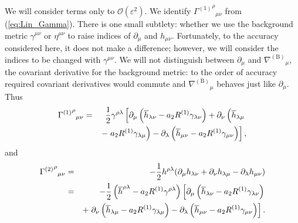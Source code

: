 \documentclass[aps,prd,amsfonts,amssymb,amsmath,nofootinbib,reprint,showpacs]{revtex4-1}
\newcommand{\eqnref}[1]{(\ref{eq:#1})}
\newcommand{\order}[1]{\ensuremath{\mathcal{O}({#1})}}
\begin{document}
We will consider terms only to $\order{\varepsilon^2}$. We identify ${{\Gamma^{(1)}}^\rho}_{\mu\nu}$ from \eqnref{Lin_Gamma}. There is one small subtlety: whether we use the background metric $\gamma^{\mu\nu}$ or $\eta^{\mu\nu}$ to raise indices of $\partial_\mu$ and $h_{\mu\nu}$. Fortunately, to the accuracy considered here, it does not make a difference; however, we will consider the indices to be changed with $\gamma^{\mu\nu}$. We will not distinguish between $\partial_\mu$ and ${\nabla^{(\text{B})}}_\mu$, the covariant derivative for the background metric: to the order of accuracy required covariant derivatives would commute and ${\nabla^{(\text{B})}}_\mu$ behaves just like $\partial_\mu$. Thus
\begin{eqnarray}
{{\Gamma^{(1)}}^\rho}_{\mu\nu} & = & \frac{1}{2}\gamma^{\rho\lambda}\left[\partial_\mu \left(\overline{h}_{\lambda\nu} - a_2 R^{(1)}\gamma_{\lambda\nu}\right) + \partial_\nu \left(\overline{h}_{\lambda\mu} \vphantom{R^{(1)}} \right. \right. \nonumber \\* 
 & & \left. - \left. a_2 R^{(1)}\gamma_{\lambda\mu}\right) - \partial_\lambda \left(\overline{h}_{\mu\nu} - a_2 R^{(1)}\gamma_{\mu\nu}\right)\right],
\end{eqnarray}
and
\begin{eqnarray}
{{\Gamma^{(2)}}^\rho}_{\mu\nu} & = & -\frac{1}{2}h^{\rho\lambda}(\partial_\mu h_{\lambda\nu} + \partial_\nu h_{\lambda\mu} - \partial_\lambda h_{\mu\nu}) \nonumber \\*
 & = & -\frac{1}{2}\left(\overline{h}^{\rho\lambda} - a_2 R^{(1)}\gamma^{\rho\lambda}\right)\left[\partial_\mu \left(\overline{h}_{\lambda\nu} - a_2 R^{(1)}\gamma_{\lambda\nu}\right)  \right. \nonumber \\*
 & & + \left. \partial_\nu \left(\overline{h}_{\lambda\mu} - a_2 R^{(1)}\gamma_{\lambda\mu}\right) - \partial_\lambda \left(\overline{h}_{\mu\nu} \vphantom{R^{(1)}} - a_2 R^{(1)}\gamma_{\mu\nu}\right)\right].
\end{eqnarray}
\end{document}
